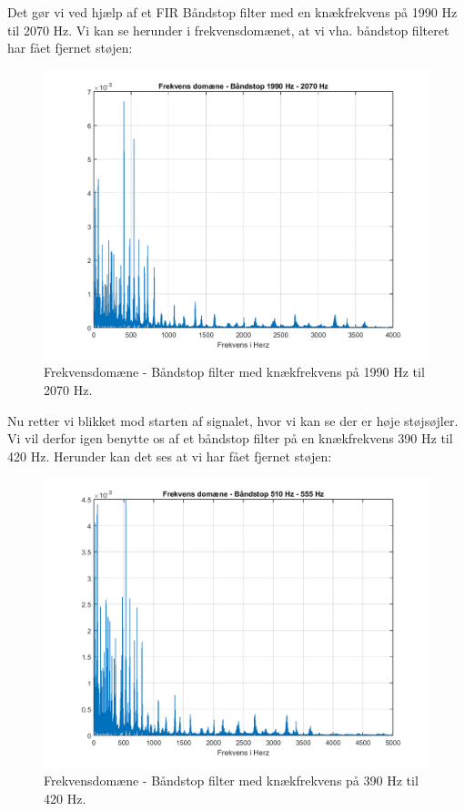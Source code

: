 \documentclass[12pt, letterpaper]{article}
\begin{document}
\newpage
Det gør vi ved hjælp af et FIR Båndstop filter med en knækfrekvens på 1990 Hz til 2070 Hz. Vi kan se herunder i frekvensdomænet, at vi vha. båndstop filteret har fået fjernet støjen: 
\begin{figure}[H]
           \includegraphics[width=\linewidth]{billeder/VinylBS1990}	   							\caption{Frekvensdomæne - Båndstop filter med knækfrekvens på 1990 Hz til 2070 Hz. }
\end{figure}

\newpage
Nu retter vi blikket mod starten af signalet, hvor vi kan se der er høje støjsøjler. Vi vil derfor igen benytte os af et båndstop filter på en knækfrekvens 390 Hz til 420 Hz. Herunder kan det ses at vi har fået fjernet støjen: 
\begin{figure}[H]
           \includegraphics[width=\linewidth]{billeder/VinylBS390}	   							\caption{Frekvensdomæne - Båndstop filter med knækfrekvens på 390 Hz til 420 Hz.}
\end{figure}
\end{document}
